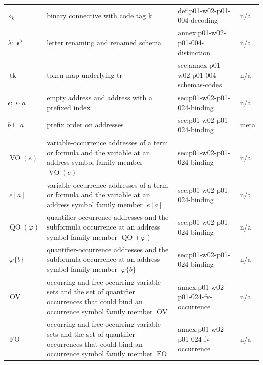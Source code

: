 \begin{longtable}{@{}p{}p{}p{}p{}@{}}
\(\circ_k\) & binary connective with code tag k & def:\allowbreak{}p01-\allowbreak{}w02-\allowbreak{}p01-\allowbreak{}004-\allowbreak{}decoding & n/a \\
\(\lambda;\allowbreak \ \mathfrak s^{\lambda}\) & letter renaming and renamed schema & annex:\allowbreak{}p01-\allowbreak{}w02-\allowbreak{}p01-\allowbreak{}004-\allowbreak{}distinction & n/a \\
\(\operatorname{tk}\) & token map underlying tr & sec:\allowbreak{}annex-\allowbreak{}p01-\allowbreak{}w02-\allowbreak{}p01-\allowbreak{}004-\allowbreak{}schemas-\allowbreak{}codes & n/a \\
\(\epsilon;\allowbreak \ i\cdot a\) & empty address and address with a prefixed index & sec:\allowbreak{}p01-\allowbreak{}w02-\allowbreak{}p01-\allowbreak{}024-\allowbreak{}binding & n/a \\
\(b\sqsubseteq a\) & prefix order on addresses & sec:\allowbreak{}p01-\allowbreak{}w02-\allowbreak{}p01-\allowbreak{}024-\allowbreak{}binding & meta \\
\(\operatorname{VO}(e)\) & variable-occurrence addresses of a term or formula and the variable at an address symbol family member \(\operatorname{VO}(e)\) & sec:\allowbreak{}p01-\allowbreak{}w02-\allowbreak{}p01-\allowbreak{}024-\allowbreak{}binding & n/a \\
\(\ e[a]\) & variable-occurrence addresses of a term or formula and the variable at an address symbol family member \(\ e[a]\) & sec:\allowbreak{}p01-\allowbreak{}w02-\allowbreak{}p01-\allowbreak{}024-\allowbreak{}binding & n/a \\
\(\operatorname{QO}(\varphi)\) & quantifier-occurrence addresses and the subformula occurrence at an address symbol family member \(\operatorname{QO}(\varphi)\) & sec:\allowbreak{}p01-\allowbreak{}w02-\allowbreak{}p01-\allowbreak{}024-\allowbreak{}binding & n/a \\
\(\ \varphi\{b\}\) & quantifier-occurrence addresses and the subformula occurrence at an address symbol family member \(\ \varphi\{b\}\) & sec:\allowbreak{}p01-\allowbreak{}w02-\allowbreak{}p01-\allowbreak{}024-\allowbreak{}binding & n/a \\
\(\operatorname{OV}\) & occurring and free-occurring variable sets and the set of quantifier occurrences that could bind an occurrence symbol family member \(\operatorname{OV}\) & annex:\allowbreak{}p01-\allowbreak{}w02-\allowbreak{}p01-\allowbreak{}024-\allowbreak{}fv-\allowbreak{}occurrence & n/a \\
\(\operatorname{FO}\) & occurring and free-occurring variable sets and the set of quantifier occurrences that could bind an occurrence symbol family member \(\operatorname{FO}\) & annex:\allowbreak{}p01-\allowbreak{}w02-\allowbreak{}p01-\allowbreak{}024-\allowbreak{}fv-\allowbreak{}occurrence & n/a \\

\end{longtable}
